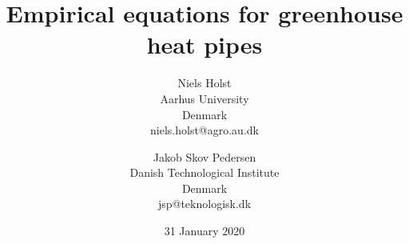 \documentclass [a4paper, 11pt, openany]  {memoir}
\begin{document}
\midsloppy
\pagestyle{ruled}

\title {Empirical equations for greenhouse heat pipes}
\author{
  Niels Holst\\Aarhus University\\Denmark\\niels.holst@agro.au.dk
  \and
  Jakob Skov Pedersen\\Danish Technological Institute\\Denmark\\jsp@teknologisk.dk
}
\date{31 January 2020}
\maketitle





\end{document}
